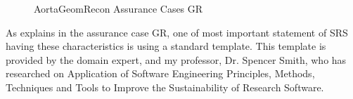 \begin{figure}[H]
    \centering
    \caption[AortaGeomRecon Assurance Cases GR]{AortaGeomRecon Assurance Cases GR}
    \label{fig_agr_ac_gr}
\end{figure}

As explains in the assurance case GR, one of  most important statement of SRS having these characteristics is using a standard template. This template is provided by the domain expert, and my professor, Dr. Spencer Smith, who has researched on Application of Software Engineering Principles, Methods, Techniques and Tools to Improve the Sustainability of Research Software.

